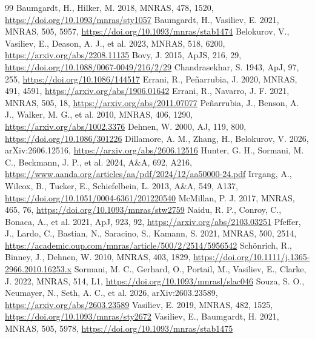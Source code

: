 \documentclass[11pt,a4paper]{article}
\begin{document}
\clearpage
\begin{thebibliography}{99}
 Baumgardt, H., Hilker, M. 2018, MNRAS, 478, 1520, \url{https://doi.org/10.1093/mnras/sty1057}
 Baumgardt, H., Vasiliev, E. 2021, MNRAS, 505, 5957, \url{https://doi.org/10.1093/mnras/stab1474}
 Belokurov, V., Vasiliev, E., Deason, A. J., et al. 2023, MNRAS, 518, 6200, \url{https://arxiv.org/abs/2208.11135}
 Bovy, J. 2015, ApJS, 216, 29, \url{https://doi.org/10.1088/0067-0049/216/2/29}
 Chandrasekhar, S. 1943, ApJ, 97, 255, \url{https://doi.org/10.1086/144517}
 Errani, R., Pe\~narrubia, J. 2020, MNRAS, 491, 4591, \url{https://arxiv.org/abs/1906.01642}
 Errani, R., Navarro, J. F. 2021, MNRAS, 505, 18, \url{https://arxiv.org/abs/2011.07077}
 Pe\~narrubia, J., Benson, A. J., Walker, M. G., et al. 2010, MNRAS, 406, 1290, \url{https://arxiv.org/abs/1002.3376}
 Dehnen, W. 2000, AJ, 119, 800, \url{https://doi.org/10.1086/301226}
 Dillamore, A. M., Zhang, H., Belokurov, V. 2026, arXiv:2606.12516, \url{https://arxiv.org/abs/2606.12516}
 Hunter, G. H., Sormani, M. C., Beckmann, J. P., et al. 2024, A\&A, 692, A216, \url{https://www.aanda.org/articles/aa/pdf/2024/12/aa50000-24.pdf}
 Irrgang, A., Wilcox, B., Tucker, E., Schiefelbein, L. 2013, A\&A, 549, A137, \url{https://doi.org/10.1051/0004-6361/201220540}
 McMillan, P. J. 2017, MNRAS, 465, 76, \url{https://doi.org/10.1093/mnras/stw2759}
 Naidu, R. P., Conroy, C., Bonaca, A., et al. 2021, ApJ, 923, 92, \url{https://arxiv.org/abs/2103.03251}
 Pfeffer, J., Lardo, C., Bastian, N., Saracino, S., Kamann, S. 2021, MNRAS, 500, 2514, \url{https://academic.oup.com/mnras/article/500/2/2514/5956542}
 Sch\"onrich, R., Binney, J., Dehnen, W. 2010, MNRAS, 403, 1829, \url{https://doi.org/10.1111/j.1365-2966.2010.16253.x}
 Sormani, M. C., Gerhard, O., Portail, M., Vasiliev, E., Clarke, J. 2022, MNRAS, 514, L1, \url{https://doi.org/10.1093/mnrasl/slac046}
 Souza, S. O., Neumayer, N., Seth, A. C., et al. 2026, arXiv:2603.23589, \url{https://arxiv.org/abs/2603.23589}
 Vasiliev, E. 2019, MNRAS, 482, 1525, \url{https://doi.org/10.1093/mnras/sty2672}
 Vasiliev, E., Baumgardt, H. 2021, MNRAS, 505, 5978, \url{https://doi.org/10.1093/mnras/stab1475}
\end{thebibliography}
\end{document}
